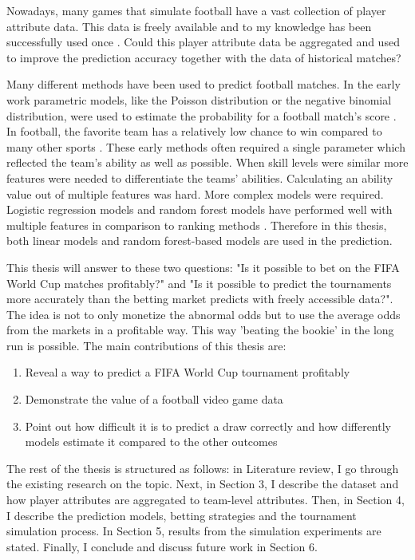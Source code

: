 Nowadays,  many games that simulate football have a vast collection of player attribute data. This data is freely available and to my knowledge has been successfully used once \cite{shin2014novel}. Could this player attribute data be aggregated and used to improve the prediction accuracy together with the data of historical matches?

Many different methods have been used to predict football matches. In the early work parametric models, like the Poisson distribution or the negative binomial distribution, were used to estimate the probability for a football match's score \cite{moroney1962facts, dixon1997}. In football, the favorite team has a relatively low chance to win compared to many other sports \cite{anderson2013numbers}. These early methods often required a single parameter which reflected the team's ability as well as possible. When skill levels were similar more features were needed to differentiate the teams' abilities. Calculating an ability value out of multiple features was hard. More complex models were required. Logistic regression models and random forest models have performed well with multiple features in comparison to ranking methods \cite{groll2018prediction, 10.1007/978-3-319-29504-6_48}. Therefore in this thesis, both linear models and random forest-based models are used in the prediction.

This thesis will answer to these two questions: "Is it possible to bet on the FIFA World Cup matches profitably?" and "Is it possible to predict the tournaments more accurately than the betting market predicts with freely accessible data?". The idea is not to only monetize the abnormal odds but to use the average odds from the markets in a profitable way. This way 'beating the bookie' in the long run is possible. The main contributions of this thesis are:
\begin{enumerate}
    \item Reveal a way to predict a FIFA World Cup tournament profitably
    \item Demonstrate the value of a football video game data
    \item Point out how difficult it is to predict a draw correctly and how differently models estimate it compared to the other outcomes
\end{enumerate}

The rest of the thesis is structured as follows: in Literature review, I go through the existing research on the topic. Next, in Section 3, I describe the dataset and how player attributes are aggregated to team-level attributes. Then, in Section 4, I describe the prediction models, betting strategies and the tournament simulation process. In Section 5, results from the simulation experiments are stated. Finally, I conclude and discuss future work in Section 6.
